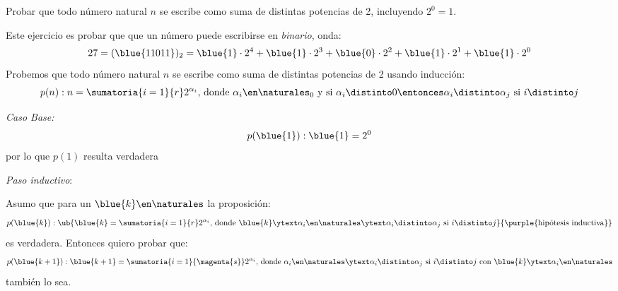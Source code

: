 \begin{enunciado}{\ejercicio}
  Probar que todo número natural $n$ se escribe como suma de distintas potencias de 2, incluyendo $2^0 = 1$.
\end{enunciado}
Este ejercicio es probar que que un número puede escribirse en \textit{binario}, onda:
$$
  27 = (\blue{11011})_2 = \blue{1} \cdot 2^4 + \blue{1} \cdot 2^3 + \blue{0} \cdot 2^2 + \blue{1} \cdot 2^1 + \blue{1} \cdot 2^0
$$
Probemos que todo número natural $n$ se escribe como suma de distintas potencias de 2 usando inducción:
$$
  p(n): n = \sumatoria{i = 1}{r}
  2^{\alpha_i},\,  \text{donde } \alpha_i \en \naturales_0 \text{ y si } \alpha_i \distinto 0 \entonces \alpha_i \distinto \alpha_j  \text{ si } i \distinto j
$$

\textit{Caso Base:}
$$
  p(\blue{1}): \blue{1} = 2^0
$$
por lo que $p(1)$ resulta verdadera

\textit{Paso inductivo}:

Asumo que para un $\blue{k} \en \naturales$ la proposición:
$$
  p(\blue{k}):
  \ub{
    \blue{k} = \sumatoria{i = 1}{r}
    2^{\alpha_i}
    ,\,  \text{donde } \blue{k} \ytext \alpha_i \en \naturales \ytext \alpha_i \distinto \alpha_j  \text{ si } i \distinto j
  }{
    \text{\purple{hipótesis inductiva}}
  }
$$
es verdadera. Entonces quiero probar que:
$$
  p(\blue{k+1}):
  \blue{k+1} =
  \sumatoria{i = 1}{\magenta{s}}
  2^{\alpha_i}
  ,\,  \text{donde } \alpha_i \en \naturales \ytext \alpha_i \distinto \alpha_j  \text{ si } i \distinto j
  \text{ con } \blue{k} \ytext \alpha_i \en \naturales
$$
también lo sea.


